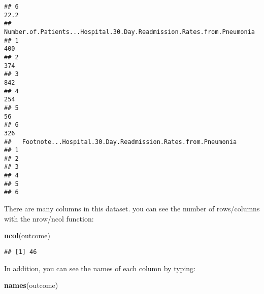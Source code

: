 \documentclass[]{article}
\newenvironment{Shaded}{\begin{snugshade}}{\end{snugshade}}
\newcommand{\KeywordTok}[1]{\textcolor[rgb]{0.13,0.29,0.53}{\textbf{#1}}}
\newcommand{\NormalTok}[1]{#1}
\begin{document}
\begin{verbatim}
## 6                                                                          22.2
##   Number.of.Patients...Hospital.30.Day.Readmission.Rates.from.Pneumonia
## 1                                                                   400
## 2                                                                   374
## 3                                                                   842
## 4                                                                   254
## 5                                                                    56
## 6                                                                   326
##   Footnote...Hospital.30.Day.Readmission.Rates.from.Pneumonia
## 1                                                            
## 2                                                            
## 3                                                            
## 4                                                            
## 5                                                            
## 6
\end{verbatim}

There are many columns in this dataset. you can see the number of
rows/columns with the nrow/ncol function:

\begin{Shaded}
\begin{Highlighting}[]
\KeywordTok{ncol}\NormalTok{(outcome) }
\end{Highlighting}
\end{Shaded}

\begin{verbatim}
## [1] 46
\end{verbatim}

In addition, you can see the names of each column by typing:

\begin{Shaded}
\begin{Highlighting}[]
\KeywordTok{names}\NormalTok{(outcome)}
\end{Highlighting}
\end{Shaded}
\end{document}
